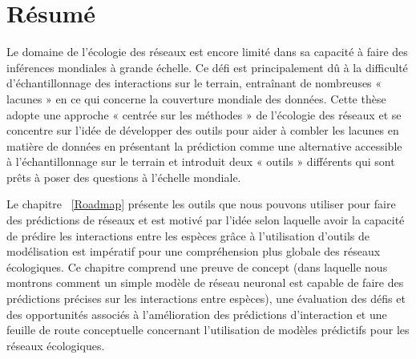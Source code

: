 \documentclass[12pt,oneside,phd]{dms}
\numberwithin{equation}{section}
\numberwithin{table}{chapter}
\numberwithin{figure}{chapter}
\begin{document}

\maketitle

\newpage
\maketitle


\francais

\chapter*{Résumé}

Le domaine de l’écologie des réseaux est encore limité dans sa capacité à faire des inférences mondiales à grande échelle. Ce défi est principalement dû à la difficulté d’échantillonnage des interactions sur le terrain, entraînant de nombreuses « lacunes » en ce qui concerne la couverture mondiale des données. Cette thèse adopte une approche « centrée sur les méthodes » de l'écologie des réseaux et se concentre sur l'idée de développer des outils pour aider à combler les lacunes en matière de données en présentant la prédiction comme une alternative accessible à l'échantillonnage sur le terrain et introduit deux « outils » différents qui sont prêts à poser des questions à l’échelle mondiale.

Le chapitre ~\ref{Roadmap} présente les outils que nous pouvons utiliser pour faire des prédictions de réseaux et est motivé par l'idée selon laquelle avoir la capacité de prédire les interactions entre les espèces grâce à l'utilisation d'outils de modélisation est impératif pour une compréhension plus globale des réseaux écologiques. Ce chapitre comprend une preuve de concept (dans laquelle nous montrons comment un simple modèle de réseau neuronal est capable de faire des prédictions précises sur les interactions entre espèces), une évaluation des défis et des opportunités associés à l'amélioration des prédictions d'interaction et une feuille de route conceptuelle concernant l'utilisation de modèles prédictifs pour les réseaux écologiques.
\end{document}
